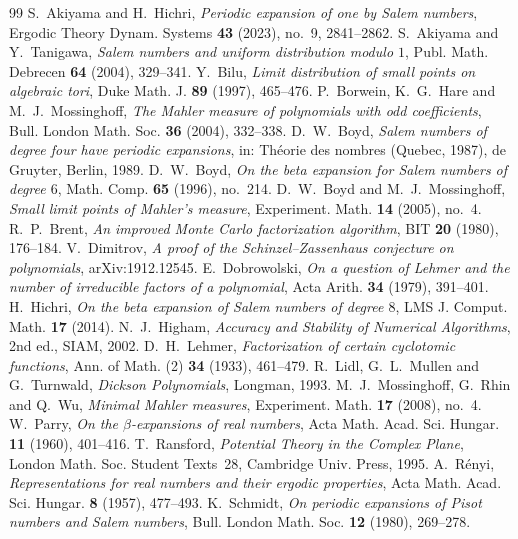 \documentclass[11pt]{amsart}
\theoremstyle{definition}
\theoremstyle{remark}
\begin{document}
\begin{thebibliography}{99}
 S.~Akiyama and H.~Hichri, \emph{Periodic expansion of one by Salem numbers}, Ergodic Theory Dynam. Systems \textbf{43} (2023), no.~9, 2841--2862.
 S.~Akiyama and Y.~Tanigawa, \emph{Salem numbers and uniform distribution modulo $1$}, Publ. Math. Debrecen \textbf{64} (2004), 329--341.
 Y.~Bilu, \emph{Limit distribution of small points on algebraic tori}, Duke Math. J. \textbf{89} (1997), 465--476.
 P.~Borwein, K.~G.~Hare and M.~J.~Mossinghoff, \emph{The Mahler measure of polynomials with odd coefficients}, Bull. London Math. Soc. \textbf{36} (2004), 332--338.
 D.~W.~Boyd, \emph{Salem numbers of degree four have periodic expansions}, in: Th\'eorie des nombres (Quebec, 1987), de Gruyter, Berlin, 1989.
 D.~W.~Boyd, \emph{On the beta expansion for Salem numbers of degree $6$}, Math. Comp. \textbf{65} (1996), no.~214.
 D.~W.~Boyd and M.~J.~Mossinghoff, \emph{Small limit points of Mahler's measure}, Experiment. Math. \textbf{14} (2005), no.~4.
 R.~P.~Brent, \emph{An improved Monte Carlo factorization algorithm}, BIT \textbf{20} (1980), 176--184.
 V.~Dimitrov, \emph{A proof of the Schinzel--Zassenhaus conjecture on polynomials}, arXiv:1912.12545.
 E.~Dobrowolski, \emph{On a question of Lehmer and the number of irreducible factors of a polynomial}, Acta Arith. \textbf{34} (1979), 391--401.
 H.~Hichri, \emph{On the beta expansion of Salem numbers of degree $8$}, LMS J. Comput. Math. \textbf{17} (2014).
 N.~J.~Higham, \emph{Accuracy and Stability of Numerical Algorithms}, 2nd ed., SIAM, 2002.
 D.~H.~Lehmer, \emph{Factorization of certain cyclotomic functions}, Ann. of Math. (2) \textbf{34} (1933), 461--479.
 R.~Lidl, G.~L.~Mullen and G.~Turnwald, \emph{Dickson Polynomials}, Longman, 1993.
 M.~J.~Mossinghoff, G.~Rhin and Q.~Wu, \emph{Minimal Mahler measures}, Experiment. Math. \textbf{17} (2008), no.~4.
 W.~Parry, \emph{On the $\beta$-expansions of real numbers}, Acta Math. Acad. Sci. Hungar. \textbf{11} (1960), 401--416.
 T.~Ransford, \emph{Potential Theory in the Complex Plane}, London Math. Soc. Student Texts~28, Cambridge Univ. Press, 1995.
 A.~R\'enyi, \emph{Representations for real numbers and their ergodic properties}, Acta Math. Acad. Sci. Hungar. \textbf{8} (1957), 477--493.
 K.~Schmidt, \emph{On periodic expansions of Pisot numbers and Salem numbers}, Bull. London Math. Soc. \textbf{12} (1980), 269--278.

\end{thebibliography}
\end{document}
